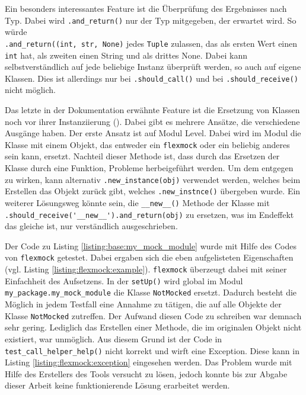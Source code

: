 Ein besonders interessantes Feature ist die Überprüfung des Ergebnisses nach
Typ. Dabei wird \lstinline{.and_return()} nur der Typ mitgegeben, der erwartet
wird. So würde
\\%
\lstinline{.and_return((int, str, None)} jedes \lstinline{Tuple}
zulassen, das als ersten Wert einen \lstinline{int} hat, als zweiten einen
String und als drittes None. Dabei kann selbstverständlich auf jede beliebige
Instanz überprüft werden, so auch auf eigene Klassen. Dies ist allerdings nur
bei \lstinline{.should_call()} und bei \lstinline{.should_receive()} nicht
möglich.

Das letzte in der Dokumentation erwähnte Feature ist die Ersetzung von Klassen
noch vor ihrer Instanziierung (\cite{flexmock:docs:0.10.3}). Dabei gibt es
mehrere Ansätze, die verschiedene Ausgänge haben. Der erste Ansatz ist
auf Modul Level. Dabei wird im Modul die Klasse mit einem Objekt, das
entweder ein \lstinline{flexmock} oder ein beliebig anderes sein kann, ersetzt.
Nachteil dieser Methode ist, dass durch das Ersetzen der Klasse durch eine
Funktion, Probleme herbeigeführt werden. Um dem entgegen zu wirken, kann
alternativ \lstinline{.new_instance(obj)} verwendet werden, welches beim
Erstellen das Objekt zurück gibt, welches \lstinline{.new_instnce()} übergeben
wurde. Ein weiterer Lösungsweg könnte sein, die \lstinline{__new__()} Methode
der Klasse mit \lstinline{.should_receive('__new__').and_return(obj)} zu
ersetzen, was im Endeffekt das gleiche ist, nur verständlich ausgeschrieben.
\newline

Der Code zu Listing \ref{listing:base:my_mock_module} wurde mit Hilfe des Codes
von \lstinline{flexmock} getestet. Dabei ergaben sich die eben aufgelisteten
Eigenschaften (vgl. Listing \ref{listing:flexmock:example}).
\lstinline{flexmock} überzeugt dabei mit seiner Einfachheit des Aufsetzens. In
der \lstinline{setUp()} wird global im Modul 
\lstinline{my_package.my_mock_module} die Klasse \lstinline{NotMocked} ersetzt.
Dadurch besteht die Möglich in jedem Testfall eine Annahme zu tätigen, die
auf alle Objekte der Klasse \lstinline{NotMocked} zutreffen. Der Aufwand diesen
Code zu schreiben war demnach sehr gering. Lediglich das Erstellen einer
Methode, die im originalen Objekt nicht existiert, war unmöglich. Aus diesem
Grund ist der Code in \lstinline{test_call_helper_help()} nicht korrekt und
wirft eine Exception. Diese kann in Listing \ref{listing:flexmock:exception}
eingesehen werden. Das Problem wurde mit Hilfe des Erstellers des Tools
versucht zu lösen, jedoch konnte bis zur Abgabe dieser Arbeit keine
funktionierende Lösung erarbeitet werden.
\newline

